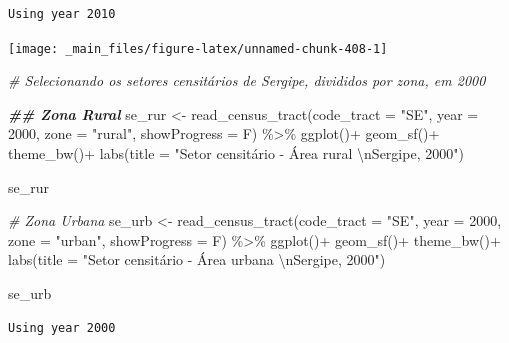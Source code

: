 \documentclass[
  brazilian,
]{book}
\newenvironment{Shaded}{\begin{snugshade}}{\end{snugshade}}
\newcommand{\AttributeTok}[1]{\textcolor[rgb]{0.77,0.63,0.00}{#1}}
\newcommand{\CommentTok}[1]{\textcolor[rgb]{0.56,0.35,0.01}{\textit{#1}}}
\newcommand{\DecValTok}[1]{\textcolor[rgb]{0.00,0.00,0.81}{#1}}
\newcommand{\DocumentationTok}[1]{\textcolor[rgb]{0.56,0.35,0.01}{\textbf{\textit{#1}}}}
\newcommand{\FunctionTok}[1]{\textcolor[rgb]{0.00,0.00,0.00}{#1}}
\newcommand{\NormalTok}[1]{#1}
\newcommand{\OtherTok}[1]{\textcolor[rgb]{0.56,0.35,0.01}{#1}}
\newcommand{\SpecialCharTok}[1]{\textcolor[rgb]{0.00,0.00,0.00}{#1}}
\newcommand{\StringTok}[1]{\textcolor[rgb]{0.31,0.60,0.02}{#1}}
\begin{document}
\begin{verbatim}
Using year 2010
\end{verbatim}

\begin{center}\texttt{[image: \_main\_files/figure-latex/unnamed-chunk-408-1]} \end{center}

\begin{Shaded}
\begin{Highlighting}[]
\CommentTok{\# Selecionando os setores censitários de Sergipe, divididos por zona, em 2000}

\DocumentationTok{\#\# Zona Rural}
\NormalTok{se\_rur }\OtherTok{\textless{}{-}} \FunctionTok{read\_census\_tract}\NormalTok{(}\AttributeTok{code\_tract =} \StringTok{"SE"}\NormalTok{,}
                            \AttributeTok{year =} \DecValTok{2000}\NormalTok{,}
                            \AttributeTok{zone =} \StringTok{"rural"}\NormalTok{,}
                            \AttributeTok{showProgress =}\NormalTok{ F) }\SpecialCharTok{\%\textgreater{}\%}
  \FunctionTok{ggplot}\NormalTok{()}\SpecialCharTok{+}
  \FunctionTok{geom\_sf}\NormalTok{()}\SpecialCharTok{+}
  \FunctionTok{theme\_bw}\NormalTok{()}\SpecialCharTok{+}
  \FunctionTok{labs}\NormalTok{(}\AttributeTok{title =} \StringTok{"Setor censitário {-} Área rural }\SpecialCharTok{\textbackslash{}n}\StringTok{Sergipe, 2000"}\NormalTok{)}

\NormalTok{se\_rur}


\CommentTok{\# Zona Urbana}
\NormalTok{se\_urb }\OtherTok{\textless{}{-}} \FunctionTok{read\_census\_tract}\NormalTok{(}\AttributeTok{code\_tract =} \StringTok{"SE"}\NormalTok{,}
                            \AttributeTok{year =} \DecValTok{2000}\NormalTok{,}
                            \AttributeTok{zone =} \StringTok{"urban"}\NormalTok{,}
                            \AttributeTok{showProgress =}\NormalTok{ F) }\SpecialCharTok{\%\textgreater{}\%}
  \FunctionTok{ggplot}\NormalTok{()}\SpecialCharTok{+}
  \FunctionTok{geom\_sf}\NormalTok{()}\SpecialCharTok{+}
  \FunctionTok{theme\_bw}\NormalTok{()}\SpecialCharTok{+}
  \FunctionTok{labs}\NormalTok{(}\AttributeTok{title =} \StringTok{"Setor censitário {-} Área urbana }\SpecialCharTok{\textbackslash{}n}\StringTok{Sergipe, 2000"}\NormalTok{)}

\NormalTok{se\_urb}
\end{Highlighting}
\end{Shaded}

\begin{verbatim}
Using year 2000
\end{verbatim}
\end{document}
